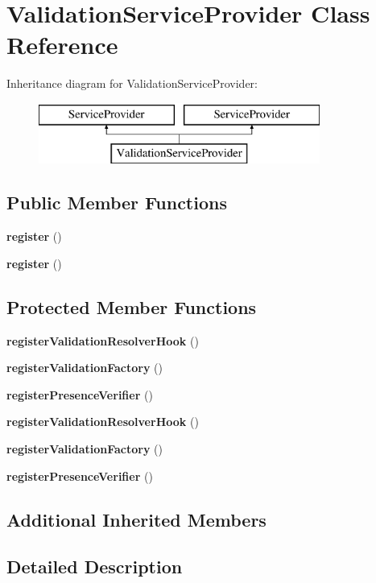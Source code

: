 \section{Validation\+Service\+Provider Class Reference}
\label{class_illuminate_1_1_validation_1_1_validation_service_provider}
Inheritance diagram for Validation\+Service\+Provider\+:\begin{figure}[H]
\begin{center}
\leavevmode
\includegraphics[height=2.000000cm]{class_illuminate_1_1_validation_1_1_validation_service_provider}
\end{center}
\end{figure}
\subsection*{Public Member Functions}
\begin{DoxyCompactItemize}
\item 
{\bf register} ()
\item 
{\bf register} ()
\end{DoxyCompactItemize}
\subsection*{Protected Member Functions}
\begin{DoxyCompactItemize}
\item 
{\bf register\+Validation\+Resolver\+Hook} ()
\item 
{\bf register\+Validation\+Factory} ()
\item 
{\bf register\+Presence\+Verifier} ()
\item 
{\bf register\+Validation\+Resolver\+Hook} ()
\item 
{\bf register\+Validation\+Factory} ()
\item 
{\bf register\+Presence\+Verifier} ()
\end{DoxyCompactItemize}
\subsection*{Additional Inherited Members}


\subsection{Detailed Description}


